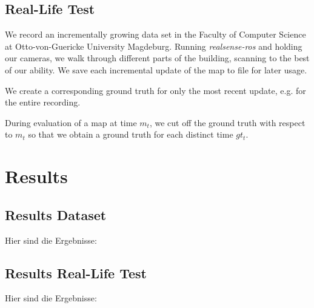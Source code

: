 \documentclass[main.tex]{subfiles}
\begin{document}
\subsection{Real-Life Test}
We record an incrementally growing data set in the Faculty of Computer Science at Otto-von-Guericke University Magdeburg.
Running \textit{realsense-ros} and holding our cameras, we walk through different parts of the building, scanning to the best of our ability.
We save each incremental update of the map to file for later usage.

We create a corresponding ground truth for only the most recent update, e.g. for the entire recording.

During evaluation of a map at time $m_t$, we cut off the ground truth with respect to $m_t$
so that we obtain a ground truth for each distinct time $gt_t$. 

\section{Results}
\subsection{Results Dataset}

Hier sind die Ergebnisse:

\subsection{Results Real-Life Test}

Hier sind die Ergebnisse:
\end{document}
